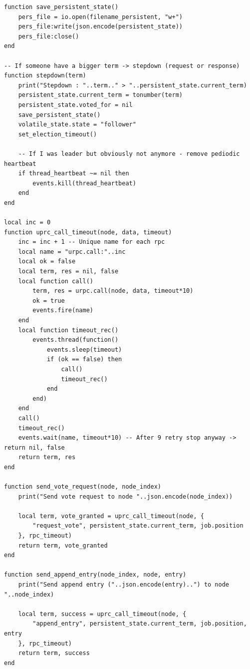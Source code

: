 \documentclass{eplmastersthesis}
\begin{document}
        \begin{minipage}{\linewidth}
        \begin{lstlisting}[style=MySmallLua,caption={Utils functions for all nodes}]
function save_persistent_state()
    pers_file = io.open(filename_persistent, "w+")
    pers_file:write(json.encode(persistent_state))
    pers_file:close()
end

-- If someone have a bigger term -> stepdown (request or response)
function stepdown(term)
    print("Stepdown : "..term.." > "..persistent_state.current_term)
    persistent_state.current_term = tonumber(term)
    persistent_state.voted_for = nil
    save_persistent_state()
    volatile_state.state = "follower"
    set_election_timeout()

    -- If I was leader but obviously not anymore - remove pediodic heartbeat
    if thread_heartbeat ~= nil then
        events.kill(thread_heartbeat)
    end
end

local inc = 0
function uprc_call_timeout(node, data, timeout)
    inc = inc + 1 -- Unique name for each rpc
    local name = "urpc.call:"..inc
    local ok = false
    local term, res = nil, false
    local function call()
        term, res = urpc.call(node, data, timeout*10)
        ok = true
        events.fire(name)
    end
    local function timeout_rec()
        events.thread(function()
            events.sleep(timeout)
            if (ok == false) then
                call()
                timeout_rec()
            end
        end)
    end
    call()
    timeout_rec()
    events.wait(name, timeout*10) -- After 9 retry stop anyway -> return nil, false
    return term, res
end

function send_vote_request(node, node_index)
    print("Send vote request to node "..json.encode(node_index))

    local term, vote_granted = uprc_call_timeout(node, {
        "request_vote", persistent_state.current_term, job.position
    }, rpc_timeout)
    return term, vote_granted
end

function send_append_entry(node_index, node, entry)
    print("Send append entry ("..json.encode(entry)..") to node "..node_index)

    local term, success = uprc_call_timeout(node, {
        "append_entry", persistent_state.current_term, job.position, entry
    }, rpc_timeout)
    return term, success
end
        \end{lstlisting}
        \end{minipage}
\end{document}
